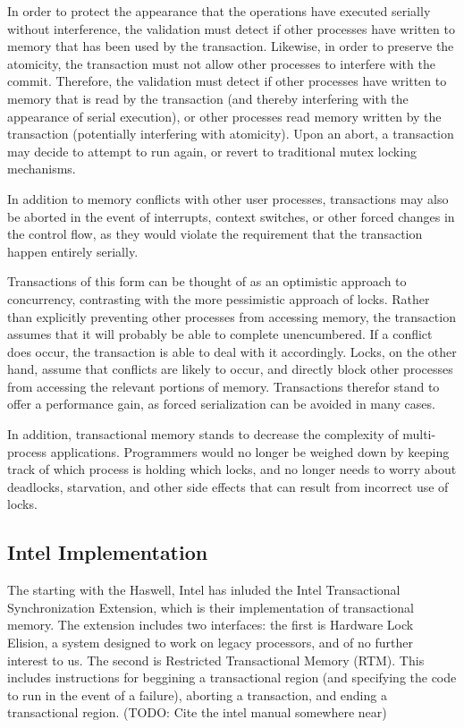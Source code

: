 \documentclass{acm_proc_article-sp}
\begin{document}
In order to protect the appearance that the operations have executed serially
without interference, the validation must detect if other processes have 
written to memory that has been used by the transaction. Likewise, in order
to preserve the atomicity, the transaction must not allow other processes
to interfere with the commit. Therefore, the validation must detect if 
other processes have written to memory that is read by the transaction 
(and thereby interfering with the appearance of serial execution), or other 
processes read memory written by the transaction (potentially interfering
with atomicity). Upon an abort, a transaction may decide to attempt to run 
again, or revert to traditional mutex locking mechanisms.~\cite{Herlihy:1993:TMA:173682.165164}

In addition to memory conflicts with other user processes, 
transactions may also be aborted in the event of interrupts, context switches,
or other forced changes in the control flow, as they would violate the
requirement that the transaction happen entirely serially. 

Transactions of this form can be thought of as an optimistic approach to
concurrency, contrasting with the more pessimistic approach of locks. 
Rather than explicitly preventing other processes from accessing memory, the
transaction assumes that it will probably be able to complete unencumbered. If
a conflict does occur, the transaction is able to deal with it accordingly.
Locks, on the other hand, assume that conflicts are likely to occur, and 
directly block other processes from accessing the relevant portions of memory.
Transactions therefor stand to offer a performance gain, as forced 
serialization can be avoided in many cases.

In addition, transactional memory stands to decrease the complexity of 
multi-process applications. Programmers would no longer be weighed down by 
keeping track of which process is holding which locks, and no longer needs
to worry about deadlocks, starvation, and other side effects that can result
from incorrect use of locks.

\subsection{Intel Implementation}

The starting with the Haswell, Intel has inluded the Intel Transactional
Synchronization Extension, which is their implementation of transactional
memory. The extension includes two interfaces: the first is Hardware Lock
Elision, a system designed to work on legacy processors, and of no further
interest to us. The second is Restricted Transactional Memory (RTM). This 
includes instructions for beggining a transactional region (and specifying the
code to run in the event of a failure), aborting a transaction, and ending a 
transactional region. (TODO: Cite the intel manual somewhere near)
\end{document}
